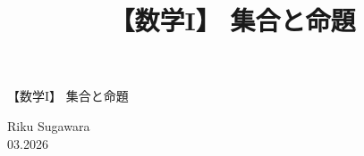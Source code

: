 \documentclass[12pt,a4paper]{jsarticle}
\title{【数学I】 集合と命題}
\author{}
\date{}
\numberwithin{theorem}{subsection}
\numberwithin{definition}{subsection}
\numberwithin{equation}{subsection}
\begin{document}
\begin{center}
{\LARGE 【数学I】 集合と命題}

\end{center}

\vspace{5mm}
\hfill Riku Sugawara \\
\hfill 03.2026

% 
% 

\end{document}
